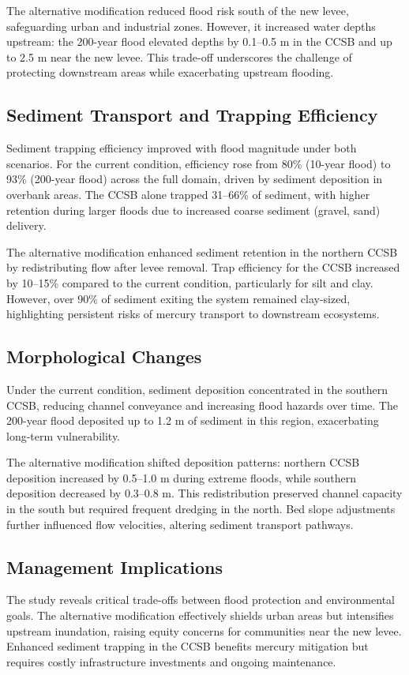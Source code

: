 \documentclass[a4paper, 11pt]{article}
\begin{document}
The alternative modification reduced flood risk south of the new levee, safeguarding urban and industrial zones. However, it increased water depths upstream: the 200-year flood elevated depths by 0.1–0.5 m in the CCSB and up to 2.5 m near the new levee. This trade-off underscores the challenge of protecting downstream areas while exacerbating upstream flooding.

\subsection{Sediment Transport and Trapping Efficiency}
\hspace*{0.5cm}Sediment trapping efficiency improved with flood magnitude under both scenarios. For the current condition, efficiency rose from 80\% (10-year flood) to 93\% (200-year flood) across the full domain, driven by sediment deposition in overbank areas. The CCSB alone trapped 31–66\% of sediment, with higher retention during larger floods due to increased coarse sediment (gravel, sand) delivery.

The alternative modification enhanced sediment retention in the northern CCSB by redistributing flow after levee removal. Trap efficiency for the CCSB increased by 10–15\% compared to the current condition, particularly for silt and clay. However, over 90\% of sediment exiting the system remained clay-sized, highlighting persistent risks of mercury transport to downstream ecosystems.

\subsection{Morphological Changes}
\hspace*{0.5cm}Under the current condition, sediment deposition concentrated in the southern CCSB, reducing channel conveyance and increasing flood hazards over time. The 200-year flood deposited up to 1.2 m of sediment in this region, exacerbating long-term vulnerability.

The alternative modification shifted deposition patterns: northern CCSB deposition increased by 0.5–1.0 m during extreme floods, while southern deposition decreased by 0.3–0.8 m. This redistribution preserved channel capacity in the south but required frequent dredging in the north. Bed slope adjustments further influenced flow velocities, altering sediment transport pathways.

\subsection{Management Implications}
\hspace*{0.5cm}The study reveals critical trade-offs between flood protection and environmental goals. The alternative modification effectively shields urban areas but intensifies upstream inundation, raising equity concerns for communities near the new levee. Enhanced sediment trapping in the CCSB benefits mercury mitigation but requires costly infrastructure investments and ongoing maintenance.
\end{document}
